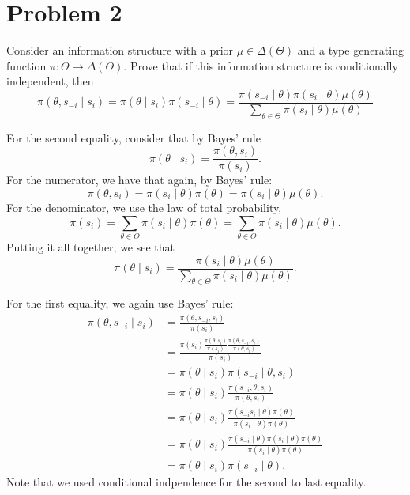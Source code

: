 \documentclass[11pt]{article}
\begin{document}
\newpage
\section*{Problem 2}
Consider an information structure with a prior $\mu \in \Delta(\Theta)$ and a type generating function $\pi: \Theta \to \Delta(\Theta).$ Prove that if this information structure is conditionally independent, then 
\[\pi(\theta, s_{-i} \mid s_i) = \pi(\theta \mid s_{i})\pi(s_{-i} \mid \theta) = \frac{\pi(s_{-i} \mid \theta) \pi(s_i \mid \theta)\mu(\theta)}{\sum_{\theta \in \Theta}\pi(s_i \mid \theta )\mu(\theta)}\]

\begin{solution}
For the second equality, consider that by Bayes' rule
\[\pi(\theta \mid s_i) =
\frac{\pi(\theta , s_i)}{\pi(s_i)}.\] For the numerator, we have that again, by Bayes' rule:
\[\pi(\theta, s_i) = \pi(s_i \mid \theta)\pi(\theta) = \pi(s_i \mid \theta)\mu(\theta).\] For the denominator, we use the law of total probability, 
\[\pi(s_i) = \sum_{\theta \in \Theta} \pi(s_i \mid \theta)\pi(\theta) = \sum_{\theta \in \Theta}\pi(s_i \mid \theta)\mu(\theta).\] Putting it all together, we see that 
\[\pi(\theta \mid s_i) =
\frac{\pi(s_i \mid \theta)\mu(\theta)}{\sum_{\theta \in \Theta}\pi(s_i \mid \theta)\mu(\theta)}.\] 

For the first equality, we again use Bayes' rule:
\begin{align*}
    \pi(\theta, s_{-i} \mid s_i) &= \frac{\pi(\theta, s_{-i}, s_i)}{\pi(s_i)}\\
    &= \frac{\pi(s_i)\frac{\pi(\theta, s_i)}{\pi(s_i)}\frac{\pi(\theta, s_{-i}, s_i)}{\pi(\theta, s_{i})}}{\pi(s_i)}\\
    &= \pi(\theta \mid s_i)\pi(s_{-i} \mid \theta, s_i)\\
    &= \pi(\theta \mid s_i) \frac{\pi(s_{-i}, \theta, s_i)}{\pi(\theta, s_i)}\\
    &= \pi(\theta \mid s_i) \frac{\pi(s_{-i} s_i \mid \theta)\pi(\theta)}{\pi(s_i \mid \theta)\pi(\theta)}\\
    &= \pi(\theta \mid s_i) \frac{\pi(s_{-i}  \mid \theta)\pi(s_i \mid \theta)\pi(\theta)}{\pi(s_i \mid \theta)\pi(\theta)}\\
    &= \pi(\theta \mid s_i)\pi(s_{-i} \mid \theta).
\end{align*}
Note that we used conditional indpendence for the second to last equality.
\end{solution}

\newpage
\end{document}
